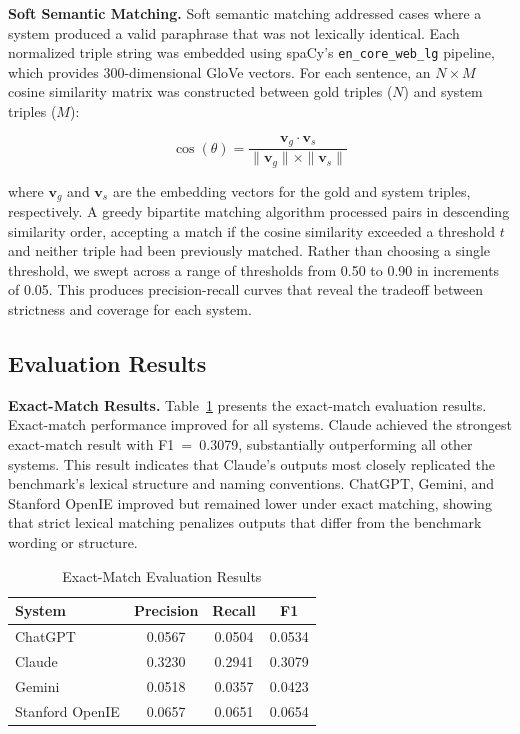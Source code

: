 \documentclass[conference]{IEEEtran}
\begin{document}
\textbf{Soft Semantic Matching.}
Soft semantic matching addressed cases where a system produced a valid paraphrase that was not lexically identical. Each normalized triple string was embedded using spaCy's \texttt{en\_core\_web\_lg} pipeline, which provides 300-dimensional GloVe vectors. For each sentence, an $N \times M$ cosine similarity matrix was constructed between gold triples ($N$) and system triples ($M$):

\begin{equation}
\cos(\theta) = \frac{\mathbf{v}_g \cdot \mathbf{v}_s}{\|\mathbf{v}_g\| \times \|\mathbf{v}_s\|}
\end{equation}

\noindent where $\mathbf{v}_g$ and $\mathbf{v}_s$ are the embedding vectors for the gold and system triples, respectively. A greedy bipartite matching algorithm processed pairs in descending similarity order, accepting a match if the cosine similarity exceeded a threshold $t$ and neither triple had been previously matched. Rather than choosing a single threshold, we swept across a range of thresholds from 0.50 to 0.90 in increments of 0.05. This produces precision-recall curves that reveal the tradeoff between strictness and coverage for each system.


\subsection{Evaluation Results}

\textbf{Exact-Match Results.}
Table~\ref{tab:exact_results} presents the exact-match evaluation results. Exact-match performance improved for all systems. Claude achieved the strongest exact-match result with F1~=~0.3079, substantially outperforming all other systems. This result indicates that Claude's outputs most closely replicated the benchmark's lexical structure and naming conventions. ChatGPT, Gemini, and Stanford OpenIE improved but remained lower under exact matching, showing that strict lexical matching penalizes outputs that differ from the benchmark wording or structure.

\begin{table}[htbp]
\caption{Exact-Match Evaluation Results}
\label{tab:exact_results}
\centering
\begin{tabular}{lccc}
\toprule
\textbf{System} & \textbf{Precision} & \textbf{Recall} & \textbf{F1} \\
\midrule
ChatGPT & 0.0567 & 0.0504 & 0.0534 \\
Claude & 0.3230 & 0.2941 & 0.3079 \\
Gemini & 0.0518 & 0.0357 & 0.0423 \\
Stanford OpenIE & 0.0657 & 0.0651 & 0.0654 \\
\bottomrule
\end{tabular}
\end{table}
\end{document}
